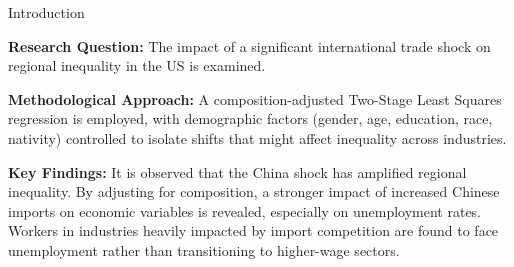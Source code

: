 \begin{frame}{Introduction}

    \begin{block}
    
        \textbf{Research Question:} The impact of a significant international trade shock on regional inequality in the US is examined.
    
    \end{block}
    \begin{block}
    
        \textbf{Methodological Approach:} A composition-adjusted Two-Stage Least Squares regression is employed, with demographic factors (gender, age, education, race, nativity) controlled to isolate shifts that might affect inequality across industries.
    
    \end{block}
    \begin{block}
    
        \textbf{Key Findings:} It is observed that the China shock has amplified regional inequality. By adjusting for composition, a stronger impact of increased Chinese imports on economic variables is revealed, especially on unemployment rates. Workers in industries heavily impacted by import competition are found to face unemployment rather than transitioning to higher-wage sectors.
    \end{block}
    
\end{frame}